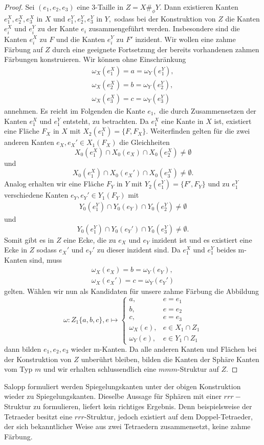 \documentclass[12pt,titlepage,twoside,cleardoublepage]{article}
\theoremstyle{nummermitklammern}
\numberwithin{equation}{section}
\begin{document}
\begin{proof}
 Sei  $(e_1,e_2,e_3)$ eine 3-Taille in $Z=X\#_{\phi}Y$. Dann existieren Kanten $e^X_1,e^X_2,e_3^X$ in $X$ und $e^Y_1,e^Y_2,e_3^Y$ in $Y,$ sodass bei der Konstruktion von $Z$ die Kanten $e_i^X$ und $e_i^Y$ zu der Kante $e_i$ zusammengeführt werden. Insbesondere sind die Kanten $e_i^X$ zu $F$ und die Kanten $e_i^Y$ zu $F'$ inzident. Wir wollen eine zahme Färbung auf $Z$ durch eine geeignete Fortsetzung der bereits vorhandenen zahmen Färbungen konstruieren.  
Wir können ohne Einschränkung 
\begin{align*}
\omega_X(e_1^X)=a=\omega_Y(e_1^Y),\\
 \omega_X(e_2^X)=b=\omega_Y(e_2^Y),\\
 \omega_X(e_3^X)=c=\omega_Y(e_3^Y)
\end{align*}
annehmen. Es reicht im Folgenden die Kante $e_1,$ die durch Zusammensetzen der Kanten $e_1^X$ und $e_1^Y$ entsteht, zu betrachten. Da $e_1^X$ eine Kante in $X$ ist, existiert eine Fläche $F_X$ in $X$ mit $X_2(e_1^X)=\{F,F_X\}$. Weiterfinden gelten für die zwei anderen Kanten $e_X,e_X'\in X_1(F_X) $ die Gleichheiten
\[
X_0(e_1^X)\cap X_0(e_X) \cap X_0(e_2^X)\neq \emptyset
\]
und 
\[
X_0(e_1^X)\cap X_0(e_X') \cap X_0(e_3^X)\neq \emptyset.
\]
 Analog erhalten wir eine Fläche $F_Y$ in $Y$ mit $Y_2(e_1^Y)=\{F',F_Y\}$ und zu $e_1^Y$ verschiedene Kanten $e_Y,e_Y'\in Y_1(F_Y)$ mit 
\begin{align*}
Y_0(e_1^Y)\cap Y_0(e_Y) \cap Y_0(e_2^Y)\neq \emptyset
\end{align*}
und 
\[
Y_0(e_1^Y)\cap Y_0(e_Y') \cap Y_0(e_3^Y)\neq \emptyset.
\]
Somit gibt es in $Z$ eine Ecke, die zu $e_X$ und $e_Y$ inzident ist und es existiert eine Ecke in $Z$ sodass  $e_X'$ und $e_Y'$ zu dieser inzident sind.
Da $e_1^X$ und $e_1^Y$ beides m-Kanten sind, muss 
\begin{align*}
\omega_X(e_X)=b=\omega_Y(e_Y),\\
\omega_X(e_X')=c=\omega_Y(e_Y')
\end{align*}
gelten.
Wählen wir nun als Kandidaten für unsere zahme Färbung die Abbildung
\[
\omega: Z_1 \{a,b,c\},e\mapsto
 \begin{cases}
 a, &e=e_1\\
 b,& e=e_2 \\
 c, & e=e_3\\
 \omega_X(e), &e \in X_1\cap Z_1\\
 \omega_Y(e), & e\in Y_1 \cap Z_1
 \end{cases}
\]
dann bilden $e_1,e_2,e_3$ wieder m-Kanten. Da alle anderen Kanten und Flächen bei der Konstruktion von $Z$ unberührt bleiben, bilden die Kanten der Sphäre Kanten vom Typ $m$ und wir erhalten schlussendlich eine $mmm$-Struktur auf $Z.$  

\end{proof}
Salopp formuliert werden Spiegelungskanten unter der obigen Konstruktion wieder zu Spiegelungskanten.
Dieselbe Aussage für Sphären mit einer $rrr-$Struktur zu formulieren, liefert kein richtiges Ergebnis. Denn beispielsweise der Tetraeder besitzt eine $rrr$-Struktur, jedoch existiert auf dem Doppel-Tetraeder, der sich bekanntlicher Weise aus zwei Tetraedern zusammensetzt, keine zahme Färbung.
\end{document}
